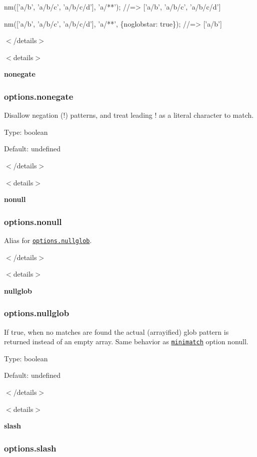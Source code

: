\begin{DoxyCode}
nm(['a/b', 'a/b/c', 'a/b/c/d'], 'a/**');
//=> ['a/b', 'a/b/c', 'a/b/c/d']

nm(['a/b', 'a/b/c', 'a/b/c/d'], 'a/**', \{noglobstar: true\});
//=> ['a/b']
\end{DoxyCode}


$<$/details$>$

$<$details$>$ 

{\bfseries nonegate}

\subsubsection*{options.\+nonegate}

Disallow negation ({\ttfamily !}) patterns, and treat leading {\ttfamily !} as a literal character to match.

Type\+: {\ttfamily boolean}

Default\+: {\ttfamily undefined}

$<$/details$>$

$<$details$>$ 

{\bfseries nonull}

\subsubsection*{options.\+nonull}

Alias for \href{#options-nullglob}{\tt options.\+nullglob}.

$<$/details$>$

$<$details$>$ 

{\bfseries nullglob}

\subsubsection*{options.\+nullglob}

If {\ttfamily true}, when no matches are found the actual (arrayified) glob pattern is returned instead of an empty array. Same behavior as \href{https://github.com/isaacs/minimatch}{\tt minimatch} option {\ttfamily nonull}.

Type\+: {\ttfamily boolean}

Default\+: {\ttfamily undefined}

$<$/details$>$

$<$details$>$ 

{\bfseries \label{_slash}%
slash}

\subsubsection*{options.\+slash}

